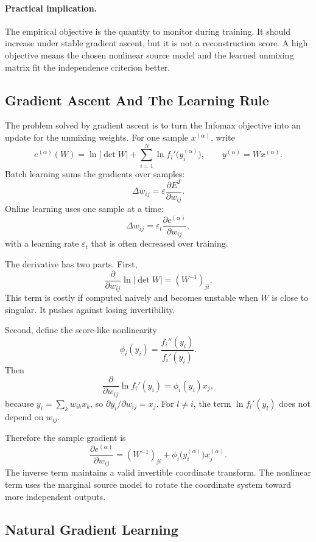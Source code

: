 \paragraph{Practical implication.}
The empirical objective is the quantity to monitor during training. It should increase under stable gradient ascent, but it is not a reconstruction score. A high objective means the chosen nonlinear source model and the learned unmixing matrix fit the independence criterion better.

\subsection{Gradient Ascent And The Learning Rule}

The problem solved by gradient ascent is to turn the Infomax objective into an update for the unmixing weights. For one sample \(x^{(\alpha)}\), write
\[
  e^{(\alpha)}(W)
  =
  \ln|\det W|
  +
  \sum_{i=1}^{N}
  \ln f_i'\bigl(y_i^{(\alpha)}\bigr),
  \qquad
  y^{(\alpha)}=Wx^{(\alpha)}.
\]
Batch learning sums the gradients over samples:
\[
  \Delta w_{ij}
  =
  \varepsilon
  \frac{\partial E^T}{\partial w_{ij}}.
\]
Online learning uses one sample at a time:
\[
  \Delta w_{ij}
  =
  \varepsilon_t
  \frac{\partial e^{(\alpha)}}{\partial w_{ij}},
\]
with a learning rate \(\varepsilon_t\) that is often decreased over training.

The derivative has two parts. First,
\[
  \frac{\partial}{\partial w_{ij}}\ln|\det W|
  =
  (W^{-1})_{ji}.
\]
This term is costly if computed naively and becomes unstable when \(W\) is close to singular. It pushes against losing invertibility.

Second, define the score-like nonlinearity
\[
  \phi_i(y_i)
  =
  \frac{f_i''(y_i)}{f_i'(y_i)}.
\]
Then
\[
  \frac{\partial}{\partial w_{ij}}
  \ln f_i'(y_i)
  =
  \phi_i(y_i)x_j,
\]
because \(y_i=\sum_k w_{ik}x_k\), so \(\partial y_i/\partial w_{ij}=x_j\). For \(l\ne i\), the term \(\ln f_l'(y_l)\) does not depend on \(w_{ij}\).

Therefore the sample gradient is
\[
  \frac{\partial e^{(\alpha)}}{\partial w_{ij}}
  =
  (W^{-1})_{ji}
  +
  \phi_i\bigl(y_i^{(\alpha)}\bigr)x_j^{(\alpha)}.
\]
The inverse term maintains a valid invertible coordinate transform. The nonlinear term uses the marginal source model to rotate the coordinate system toward more independent outputs.

\subsection{Natural Gradient Learning}

